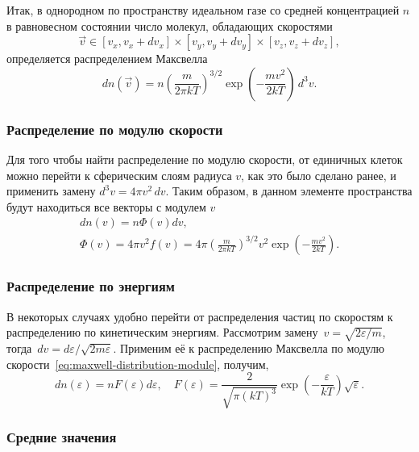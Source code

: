 Итак, в однородном по пространству идеальном газе со средней концентрацией $n$ в равновесном состоянии число молекул, обладающих скоростями
\begin{equation*}
    \vec{v} \in [v_x, v_x + d v_x] \times [v_y, v_y + d v_y] \times [v_z, v_z + d v_z],
\end{equation*}
определяется распределением Максвелла
\begin{equation}
    d n(\vec{v})
        = n \left(\frac{m}{2 \pi k T}\right)^{3 / 2} \exp \left(-\frac{m v^2}{2 k T}\right) \, d^3 v.
    \label{eq:maxwell-distribution}
\end{equation}

\subsubsection{Распределение по модулю скорости}
Для того чтобы найти распределение по модулю скорости, от единичных клеток можно перейти к сферическим слоям радиуса $v$, как это было сделано ранее, и применить замену $d^3 v = 4 \pi v^2 \, dv$. Таким образом, в данном элементе пространства будут находиться все векторы с модулем $v$
\begin{gather}
d n(v)=n \Phi(v) d v, \nonumber\\ 
\Phi(v)=4 \pi v^2 f(v)=4 \pi\left(\frac{m}{2 \pi k T}\right)^{3 / 2} v^2 \exp \left(-\frac{m v^2}{2 k T}\right).
\label{eq:maxwell-distribution-module}
\end{gather}

\subsubsection{Распределение по энергиям}
В некоторых случаях удобно перейти от распределения частиц по скоростям к распределению по кинетическим энергиям. Рассмотрим замену~$v = \sqrt{2 \varepsilon / m}$, тогда~$dv = d\varepsilon / \sqrt{2 m \varepsilon}$. Применим её к распределению Максвелла по модулю скорости~\eqref{eq:maxwell-distribution-module}, получим,
\begin{equation}
d n(\varepsilon)=n F(\varepsilon) d \varepsilon, \quad F(\varepsilon)=\frac{2}{\sqrt{\pi(k T)^3}} \exp \left(-\frac{\varepsilon}{k T}\right) \sqrt{\varepsilon}.
\end{equation}

\subsubsection{Средние значения}

